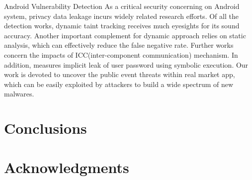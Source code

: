 \documentclass{sig-alternate-05-2015}
\begin{document}
Android Vulnerability Detection
As a critical security concerning on Android system, privacy data leakage incurs widely related research efforts. 
Of all the detection works, dynamic taint tracking \cite{enck2014taintdroid}\cite{klieber2014android}\cite{rastogi2013appsplayground}\cite{poeplau2014execute} receives much eyesights for its sound accuracy.
Another important complement for dynamic approach relies on static analysis\cite{lu2012chex}\cite{arzt2014flowdroid}\cite{gordon2015DroidSafe}, which can effectively reduce the false negative rate. Further works concern the impacts of ICC(inter-component communication) mechanism\cite{cao2015edgeminer}\cite{octeau2013epicc}\cite{li2015iccta}. In addition,
\cite{cox2014spandex} measures implicit leak of user password using symbolic execution. Our work is devoted to uncover the public event threats within real market app, which can be easily exploited by attackers to build a wide spectrum of new malwares. 
















\section{Conclusions}


\section{Acknowledgments}

%
\end{document}
